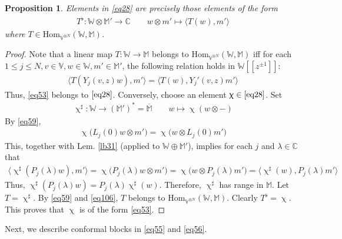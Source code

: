 \documentclass[11pt,b5paper,notitlepage]{article}
\theoremstyle{definition}
\theoremstyle{plain}
\newtheorem{pp}[df]{Proposition}
\newcommand{\ovl}{\overline}
\newcommand{\Hom}{\mathrm{Hom}}
\newcommand{\Vbb}{\mathbb V}
\newcommand{\Wbb}{\mathbb W}
\newcommand{\Mbb}{\mathbb M}
\newcommand{\Cbb}{\mathbb C}
\newcommand{\<}{\left\langle}
\renewcommand{\>}{\right\rangle}
\newcommand{\Lan}{{\big\langle}}
\newcommand{\Ran}{{\big\rangle}}
\numberwithin{equation}{section}
\begin{document}
\begin{pp}\label{lb19}
Elements in \eqref{eq28} are precisely those elements of the form 
	\begin{align}\label{eq53}
		T^\flat:\Wbb\otimes \Mbb'\rightarrow \Cbb\qquad w\otimes  m'\mapsto \Lan T(w),m' \Ran
	\end{align}
	where $T\in \Hom_{\Vbb^{\otimes N}}(\Wbb,\Mbb)$. 
\end{pp}
\begin{proof}
Note that a linear map $T:\Wbb\rightarrow\Mbb$ belongs to $\Hom_{\Vbb^{\otimes N}}(\Wbb,\Mbb)$ iff for each $1\leq j\leq N,v\in\Vbb,w\in \Wbb,m'\in \Mbb'$, the following relation holds in $\Wbb[[z^{\pm1}]]$:
\begin{align}\label{eq106}
	\Lan T(Y_j(v,z)w),m'\Ran=\Lan T(w),Y_j'(v,z)m'\Ran
\end{align}
Thus, \eqref{eq53} belongs to $\eqref{eq28}$. Conversely, choose an element $\upchi\in \eqref{eq28}$. Set  
\begin{align*}
\upchi^\sharp:\Wbb\rightarrow (\Mbb')^*=\ovl{\Mbb}\qquad w\mapsto \upchi(w\otimes-)
\end{align*}
By \eqref{eq59}, 
\begin{align*}
\upchi\big(L_j(0)w\otimes m'\big)=	\upchi\big(w\otimes L_j(0) m'\big)
	\end{align*}
This, together with Lem. \ref{lb31} (applied to $\Wbb\oplus\Mbb'$), implies for each $j$ and $\lambda\in\Cbb$ that
	\begin{align*}
\Lan \upchi^\sharp (P_j(\lambda)w),m' \Ran=	\upchi\big(P_j(\lambda)w\otimes m'\big)=\upchi\big(w\otimes P_j(\lambda) m'\big)=	\Lan \upchi^\sharp (w),P_j(\lambda) m'\Ran
		\end{align*}
		Thus, $\upchi^\sharp (P_j(\lambda)w)=P_j(\lambda)\upchi^\sharp(w)$. Therefore, $\upchi^\sharp$ has range in $\Mbb$. Let $T=\upchi^\sharp$. By \eqref{eq59} and \eqref{eq106}, $T$ belongs to $\Hom_{\Vbb^{\otimes N}}(\Wbb,\Mbb)$. Clearly $T^\flat=\upchi$. This proves that $\upchi$ is of the form \eqref{eq53}.
\end{proof}


Next, we describe conformal blocks in \eqref{eq55} and \eqref{eq56}.
\end{document}

